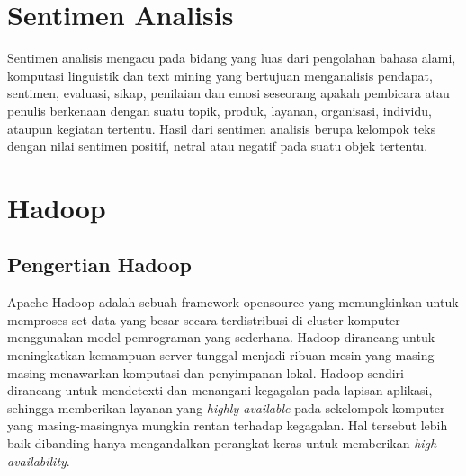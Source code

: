 \section{Sentimen Analisis}
\label{sec:sentimen_analisis}
Sentimen analisis mengacu pada bidang yang luas dari pengolahan bahasa alami, komputasi linguistik dan text mining yang bertujuan menganalisis pendapat, sentimen, evaluasi, sikap, penilaian dan emosi seseorang apakah pembicara atau penulis berkenaan dengan suatu topik, produk, layanan, organisasi, individu, ataupun kegiatan tertentu. \cite{liu2012sentiment} Hasil dari sentimen analisis berupa kelompok teks dengan nilai sentimen positif, netral atau negatif pada suatu objek tertentu.

\section{Hadoop}
\label{sec:hadoop}

\subsection{Pengertian Hadoop}
\label{sec:pengertian_hadoop}
Apache Hadoop adalah sebuah framework opensource yang memungkinkan untuk memproses set data yang besar secara terdistribusi di cluster komputer menggunakan model pemrograman yang sederhana. Hadoop dirancang untuk meningkatkan kemampuan server tunggal menjadi ribuan mesin yang masing-masing menawarkan komputasi dan penyimpanan lokal. Hadoop sendiri dirancang untuk mendetexti dan menangani kegagalan pada lapisan aplikasi, sehingga memberikan layanan yang \textit{highly-available} pada sekelompok komputer yang masing-masingnya mungkin rentan terhadap kegagalan. Hal tersebut lebih baik dibanding hanya mengandalkan perangkat keras untuk memberikan \textit{high-availability}.

